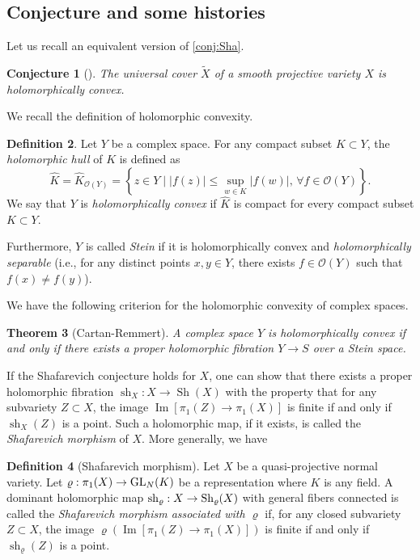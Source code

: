 \documentclass[english]{amsproc}
\theoremstyle{plain}
\newtheorem{thm}{Theorem}[section]
\newtheorem{conjecture}[thm]{Conjecture}
\theoremstyle{definition}
\newtheorem{dfn}[thm]{Definition}
\theoremstyle{remark}
\theoremstyle{plain}
\numberwithin{equation}{thm} %
\newcommand{\GL}{{\rm GL}}
\begin{document}
\subsection{Conjecture and some histories}
Let us recall an equivalent version of \cref{conj:Sha}. 
\begin{conjecture}[\cite{Sha77}]
	The universal cover $\widetilde{X}$ of a smooth projective variety $X$ is holomorphically convex.
\end{conjecture}
We recall the definition of holomorphic convexity. 
\begin{dfn}
	Let $Y$ be a complex space. For any compact subset $K\subset Y$, the \emph{holomorphic hull} of $K$ is defined as
	\[
	\widehat{K}=\widehat{K}_{\mathcal{O}(Y)}=\left\{z \in Y \mid |f(z)| \leqslant \sup_{w \in K}|f(w)|, \, \forall f \in \mathcal{O}(Y)\right\}.
	\]
	We say that $Y$ is \emph{holomorphically convex} if $\widehat{K}$ is compact for every compact subset $K \subset Y$.
	
	Furthermore, $Y$ is called \emph{Stein} if it is holomorphically convex and \emph{holomorphically separable} (i.e., for any distinct points $x, y \in Y$, there exists $f\in \mathcal{O}(Y)$ such that $f(x)\neq f(y)$).
\end{dfn} 

We have the following criterion for the holomorphic convexity of complex spaces.

\begin{thm}[Cartan-Remmert]\label{thm:Cartan}
	A complex space $Y$ is \emph{holomorphically convex} if and only if there exists a proper holomorphic fibration $Y\to S$ over a Stein space.
\end{thm}

If the Shafarevich conjecture holds for $X$, one can show that there exists a proper holomorphic fibration $\operatorname{sh}_X:X\to \operatorname{Sh}(X)$ with the property that for any subvariety $Z\subset X$, the image $\operatorname{Im}[\pi_1(Z)\to \pi_1(X)]$ is finite if and only if $\operatorname{sh}_X(Z)$ is a point. 
Such a holomorphic map, if it exists, is called the \emph{Shafarevich morphism} of $X$. 
More generally, we have
\begin{dfn}[Shafarevich morphism]\label{def:Shafarevich morphism}
	Let $X$ be a quasi-projective normal variety. Let $\varrho:\pi_1(X)\to \GL_{N}(K)$ be a representation where $K$ is any field. A dominant  holomorphic map ${\rm sh}_\varrho:X\to {\rm Sh}_\varrho(X)$ with general fibers connected is called the \emph{Shafarevich morphism associated with $\varrho$} if, for any closed subvariety $Z \subset X$, the image $\varrho(\operatorname{Im}[\pi_1(Z)\to \pi_1(X)])$ is finite if and only if $\operatorname{sh}_\varrho(Z)$ is a point.
\end{dfn}
\end{document}
